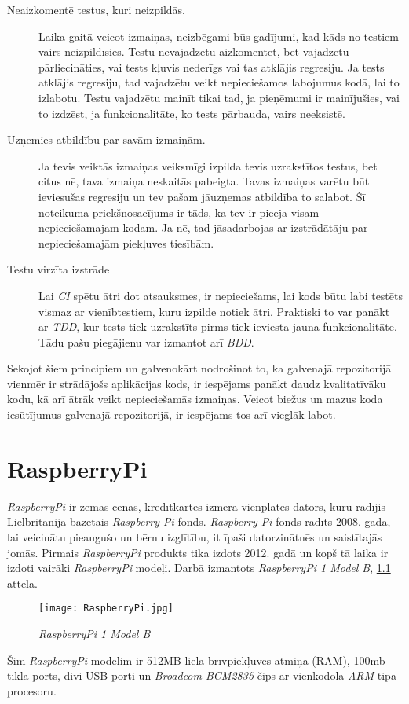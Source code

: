 \begin{description}
	\item [Neaizkomentē testus, kuri neizpildās.] Laika gaitā veicot izmaiņas, neizbēgami būs gadījumi, kad kāds no testiem vairs neizpildīsies. Testu nevajadzētu aizkomentēt, bet vajadzētu pārliecināties, vai tests kļuvis nederīgs vai tas atklājis regresiju. Ja tests atklājis regresiju, tad vajadzētu veikt nepieciešamos labojumus kodā, lai to izlabotu. Testu vajadzētu mainīt tikai tad, ja pieņēmumi ir mainījušies, vai to izdzēst, ja funkcionalitāte, ko tests pārbauda, vairs neeksistē.
	\item [Uzņemies atbildību par savām izmaiņām.] Ja tevis veiktās izmaiņas veiksmīgi izpilda tevis uzrakstītos testus, bet citus nē, tava izmaiņa neskaitās pabeigta. Tavas izmaiņas varētu būt ieviesušas regresiju un tev pašam jāuzņemas atbildība to salabot. Šī noteikuma priekšnosacījums ir tāds, ka tev ir pieeja visam nepieciešamajam kodam. Ja nē, tad jāsadarbojas ar izstrādātāju par nepieciešamajām piekļuves tiesībām.
	\item [Testu virzīta izstrāde] Lai \textit{CI} spētu ātri dot atsauksmes, ir nepieciešams, lai kods būtu labi testēts vismaz ar vienībtestiem, kuru izpilde notiek ātri. Praktiski to var panākt ar \textit{TDD}, kur tests tiek uzrakstīts pirms tiek ieviesta jauna funkcionalitāte. Tādu pašu piegājienu var izmantot arī \textit{BDD}.
\end{description}
Sekojot šiem principiem un galvenokārt nodrošinot to, ka galvenajā repozitorijā vienmēr ir strādājošs aplikācijas kods, ir iespējams panākt daudz kvalitatīvāku kodu, kā arī ātrāk veikt nepieciešamās izmaiņas. Veicot biežus un mazus koda iesūtījumus galvenajā repozitorijā, ir iespējams tos arī vieglāk labot.


\chapter{RaspberryPi}
\textit{RaspberryPi} ir zemas cenas, kredītkartes izmēra vienplates dators, kuru radījis Lielbritānijā bāzētais \textit{Raspberry Pi} fonds. \textit{Raspberry Pi} fonds radīts 2008. gadā, lai veicinātu pieaugušo un bērnu izglītību, it īpaši datorzinātnēs un saistītajās jomās. Pirmais \textit{RaspberryPi} produkts tika izdots 2012. gadā un kopš tā laika ir izdoti vairāki \textit{RaspberryPi} modeļi. Darbā izmantots \textit{RaspberryPi 1 Model B}, \ref{fig:RaspberryPi} attēlā.
\cite{raspberryHelp}
\begin{figure}[H]%
	\centering
	\captionsetup{justification=centering}
	\texttt{[image: RaspberryPi.jpg]}
	\caption{\textit{RaspberryPi 1 Model B}}
	\label{fig:RaspberryPi}
\end{figure}
Šim \textit{RaspberryPi} modelim ir 512MB liela brīvpiekļuves atmiņa (RAM), 100mb tīkla ports, divi USB porti un \textit{Broadcom BCM2835} čips ar vienkodola \textit{ARM} tipa procesoru.

